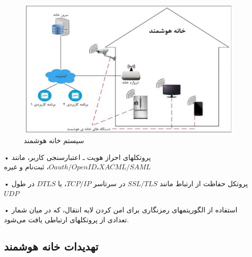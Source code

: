 \documentclass[aimcpersian]{aimc46}
\begin{document}
\begin{figure}[h]
\centering
\includegraphics[width=13cm]{figures/Home.png}
\caption{سیستم خانه هوشمند}
\label{Home}
\end{figure}



•	پروتکلهای احراز هویت ـ اعتبارسنجی کاربر، مانند $Oauth/OpenID، XACML/SAML$، ثبت‌نام و غیره

•	پروتکل حفاظت از ارتباط مانند $SSL/TLS$ در سرتاسر $TCP/IP$، یا $DTLS$ در طول $UDP$ 

•	استفاده از الگوریتمهای رمزنگاری برای امن کردن لایه انتقال، که در میان شمار تعدادی از پروتکلهای ارتباطی یافت می‌شود.
 

\subsection{تهدیدات خانه هوشمند}
\end{document}
